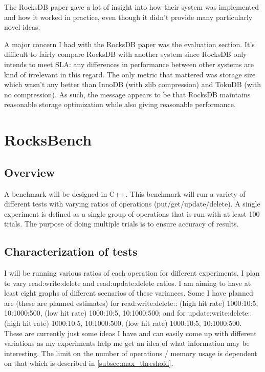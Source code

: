 \documentclass[twocolumn,11pt]{article}
\begin{document}

The RocksDB paper gave a lot of insight into how their system was implemented
and how it worked in practice, even though it didn't provide many particularly
novel ideas.

A major concern I had with the RocksDB paper was the evaluation section. It's
difficult to fairly compare RocksDB with another system since RocksDB only
intends to meet SLA: any differences in performance between other systems are
kind of irrelevant in this regard. The only metric that mattered was storage
size which wasn't any better than InnoDB (with zlib compression) and TokuDB
(with no compression). As such, the message appears to be that RocksDB maintains
reasonable storage optimization while also giving reasonable performance.

\section{RocksBench}

\subsection{Overview}

A benchmark will be designed in C++. This benchmark will run a variety of
different tests with varying ratios of operations (put/get/update/delete). A
single experiment is defined as a single group of operations that is run with at
least 100 trials. The purpose of doing multiple trials is to ensure accuracy of
results.

\subsection{Characterization of tests}
\label{subsec:characterization_tests}

I will be running various ratios of each operation for different experiments. I
plan to vary read:write:delete and read:update:delete ratios. I am aiming to
have at least eight graphs of different scenarios of these variances. Some I
have planned are (these are planned estimates) for read:write:delete:: (high hit
rate) 1000:10:5, 10:1000:500, (low hit rate) 1000:10:5, 10:1000:500; and for
update:write:delete:: (high hit rate) 1000:10:5, 10:1000:500, (low hit rate)
1000:10:5, 10:1000:500. These are currently just some ideas I have and can
easily come up with different variations as my experiments help me get an idea
of what information may be interesting. The limit on the number of operations /
memory usage is dependent on that which is described in
\ref{subsec:max_threshold}.
\end{document}
